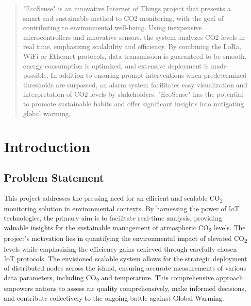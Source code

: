 \documentclass[conference]{IEEEtran}
\begin{document}
\maketitle

\begin{abstract}
"EcoSense" is an innovative Internet of Things project that presents a smart and sustainable method to CO2 monitoring, with the goal of contributing to environmental well-being. Using inexpensive microcontrollers and innovative sensors, the system analyzes CO2 levels in real time, emphasizing scalability and efficiency. By combining the LoRa, WiFi or Ethernet protocols, data transmission is guaranteed to be smooth, energy consumption is optimized, and extensive deployment is made possible. In addition to ensuring prompt interventions when predetermined thresholds are surpassed, an alarm system facilitates easy visualization and interpretation of CO2 levels by stakeholders. "EcoSense" has the potential to promote sustainable habits and offer significant insights into mitigating global warming.
\end{abstract}

\IEEEpeerreviewmaketitle

\section{Introduction}

\subsection{Problem Statement}
This project addresses the pressing need for an efficient and scalable CO\textsubscript{2} monitoring solution in environmental contexts. By harnessing the power of IoT technologies, the primary aim is to facilitate real-time analysis, providing valuable insights for the sustainable management of atmospheric CO\textsubscript{2} levels. The project's motivation lies in quantifying the environmental impact of elevated CO\textsubscript{2} levels while emphasizing the efficiency gains achieved through carefully chosen IoT protocols. The envisioned scalable system allows for the strategic deployment of distributed nodes across the island, ensuring accurate measurements of various data parameters, including CO\textsubscript{2} and temperature. This comprehensive approach empowers nations to assess air quality comprehensively, make informed decisions, and contribute collectively to the ongoing battle against Global Warming.
\end{document}

